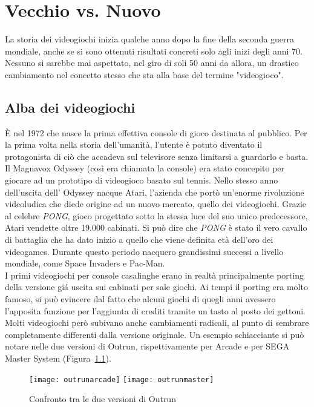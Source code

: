 \chapter{Vecchio vs. Nuovo}
La storia dei videogiochi inizia qualche anno dopo la fine della seconda guerra mondiale, anche se si sono ottenuti risultati concreti solo agli inizi degli anni 70. Nessuno si sarebbe mai aspettato,  nel giro di soli 50 anni da allora, un drastico cambiamento nel concetto stesso che sta alla base del termine "videogioco".
\section{Alba dei videogiochi}
È nel 1972 che nasce la prima effettiva console di gioco destinata al pubblico. Per la prima volta nella storia dell’umanità, l’utente è potuto diventato il protagonista di ciò che accadeva sul televisore senza limitarsi a guardarlo e basta. Il Magnavox Odyssey (così era chiamata la console) era stato concepito per giocare ad un prototipo di videogioco basato sul tennis. Nello stesso anno dell’uscita dell’ Odyssey nacque Atari, l’azienda che portò un’enorme rivoluzione videoludica che diede origine ad un nuovo mercato, quello dei videogiochi. Grazie al celebre \textit{PONG}, gioco progettato sotto la stessa luce del suo unico predecessore, Atari vendette oltre 19.000 cabinati. Si può dire che \textit{PONG} è stato il vero cavallo di battaglia che ha dato inizio a quello che viene definita età dell’oro dei videogames. Durante questo periodo nacquero grandissimi successi a livello mondiale, come Space Invaders e Pac-Man.\\I primi videogiochi per console casalinghe erano in realtà principalmente porting della versione giá uscita sui cabinati per sale giochi. Ai tempi il porting era molto famoso, si può evincere dal fatto che alcuni giochi di quegli anni avessero l’apposita funzione per l’aggiunta di crediti tramite un tasto al posto dei gettoni. Molti videogiochi però subivano anche cambiamenti radicali, al punto di sembrare completamente differenti dalla versione originale. Un esempio schiacciante si può notare nelle due versioni di Outrun, rispettivamente per Arcade e per SEGA Master System (Figura~\ref{fig:outrun}).\\
\begin{figure}[h!]
\texttt{[image: outrunarcade]}
\texttt{[image: outrunmaster]}
\caption{Confronto tra le due versioni di Outrun}
\label{fig:outrun}
\end{figure}
